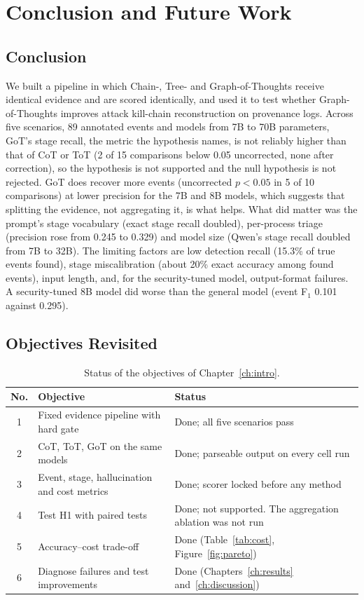 \chapter{Conclusion and Future Work}
\label{ch:conclusion}

\section{Conclusion}
We built a pipeline in which Chain-, Tree- and Graph-of-Thoughts receive identical evidence and are scored identically, and used it to test whether Graph-of-Thoughts improves attack kill-chain reconstruction on provenance logs. Across five scenarios, 89 annotated events and models from 7B to 70B parameters, GoT's stage recall, the metric the hypothesis names, is not reliably higher than that of CoT or ToT (2 of 15 comparisons below 0.05 uncorrected, none after correction), so the hypothesis is not supported and the null hypothesis is not rejected. GoT does recover more events (uncorrected $p<0.05$ in 5 of 10 comparisons) at lower precision for the 7B and 8B models, which suggests that splitting the evidence, not aggregating it, is what helps. What did matter was the prompt's stage vocabulary (exact stage recall doubled), per-process triage (precision rose from 0.245 to 0.329) and model size (Qwen's stage recall doubled from 7B to 32B). The limiting factors are low detection recall (15.3\% of true events found), stage miscalibration (about 20\% exact accuracy among found events), input length, and, for the security-tuned model, output-format failures. A security-tuned 8B model did worse than the general model (event F$_1$ 0.101 against 0.295).

\section{Objectives Revisited}
\begin{table}[H]
\centering
\caption{Status of the objectives of Chapter~\ref{ch:intro}.}
\label{tab:objectives}
\small
\begin{tabularx}{\textwidth}{@{}c >{\raggedright\arraybackslash}p{6.2cm} Y@{}}
\toprule
\textbf{No.} & \textbf{Objective} & \textbf{Status} \\
 & Fixed evidence pipeline with hard gate & Done; all five scenarios pass \\
2 & CoT, ToT, GoT on the same models & Done; parseable output on every cell run \\
3 & Event, stage, hallucination and cost metrics & Done; scorer locked before any method \\
4 & Test H1 with paired tests & Done; not supported. The aggregation ablation was not run \\
5 & Accuracy--cost trade-off & Done (Table~\ref{tab:cost}, Figure~\ref{fig:pareto}) \\
6 & Diagnose failures and test improvements & Done (Chapters~\ref{ch:results} and~\ref{ch:discussion}) \\
\bottomrule
\end{tabularx}
\end{table}

